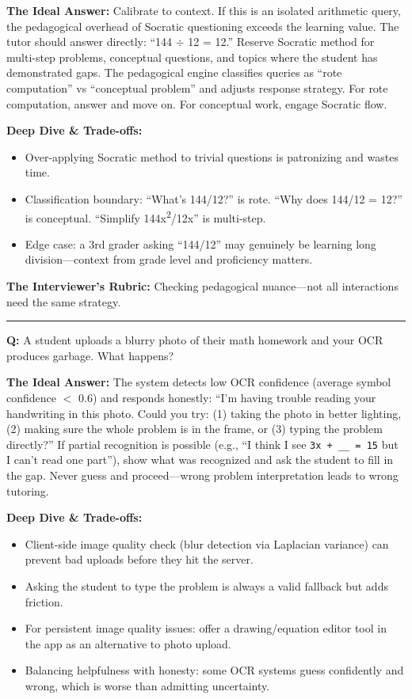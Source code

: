 \textbf{The Ideal Answer:} Calibrate to context. If this is an isolated arithmetic query, the pedagogical overhead of Socratic questioning exceeds the learning value. The tutor should answer directly: ``144 $\div$ 12 = 12.'' Reserve Socratic method for multi-step problems, conceptual questions, and topics where the student has demonstrated gaps. The pedagogical engine classifies queries as ``rote computation'' vs ``conceptual problem'' and adjusts response strategy. For rote computation, answer and move on. For conceptual work, engage Socratic flow.

\textbf{Deep Dive \& Trade-offs:}
\begin{itemize}
  \item Over-applying Socratic method to trivial questions is patronizing and wastes time.
  \item Classification boundary: ``What's 144/12?'' is rote. ``Why does 144/12 = 12?'' is conceptual. ``Simplify 144x\textsuperscript{2}/12x'' is multi-step.
  \item Edge case: a 3rd grader asking ``144/12'' may genuinely be learning long division---context from grade level and proficiency matters.
\end{itemize}

\textbf{The Interviewer's Rubric:} Checking pedagogical nuance---not all interactions need the same strategy.

\bigskip\hrule\bigskip

\textbf{Q:} A student uploads a blurry photo of their math homework and your OCR produces garbage. What happens?

\textbf{The Ideal Answer:} The system detects low OCR confidence (average symbol confidence $<$ 0.6) and responds honestly: ``I'm having trouble reading your handwriting in this photo. Could you try: (1) taking the photo in better lighting, (2) making sure the whole problem is in the frame, or (3) typing the problem directly?'' If partial recognition is possible (e.g., ``I think I see \texttt{3x + \_\_ = 15} but I can't read one part''), show what was recognized and ask the student to fill in the gap. Never guess and proceed---wrong problem interpretation leads to wrong tutoring.

\textbf{Deep Dive \& Trade-offs:}
\begin{itemize}
  \item Client-side image quality check (blur detection via Laplacian variance) can prevent bad uploads before they hit the server.
  \item Asking the student to type the problem is always a valid fallback but adds friction.
  \item For persistent image quality issues: offer a drawing/equation editor tool in the app as an alternative to photo upload.
  \item Balancing helpfulness with honesty: some OCR systems guess confidently and wrong, which is worse than admitting uncertainty.
\end{itemize}

